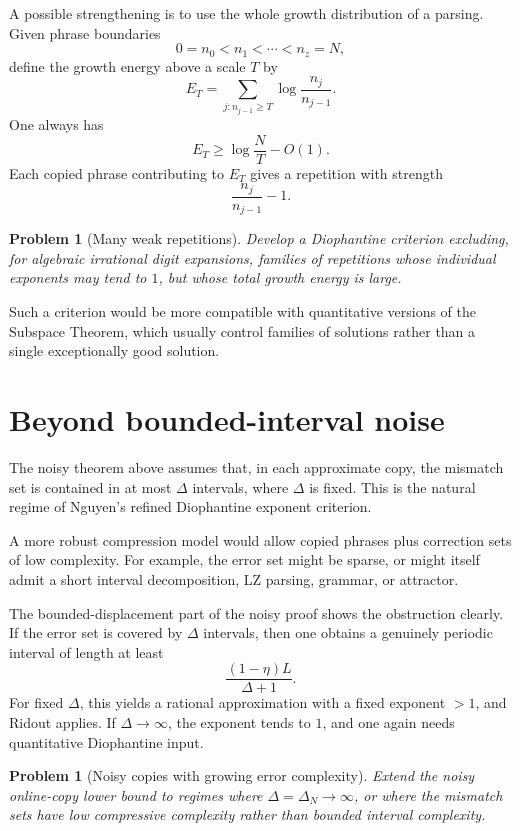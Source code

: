 \documentclass[11pt]{amsart}
\newtheorem{problem}[theorem]{Problem}
\theoremstyle{definition}
\begin{document}
A possible strengthening is to use the whole growth distribution of a parsing. Given phrase boundaries
\[
0=n_0<n_1<\cdots<n_z=N,
\]
define the growth energy above a scale \(T\) by
\[
E_T
=
\sum_{j:n_{j-1}\geq T}
\log\frac{n_j}{n_{j-1}}.
\]
One always has
\[
E_T\geq \log\frac{N}{T}-O(1).
\]
Each copied phrase contributing to \(E_T\) gives a repetition with strength
\[
\frac{n_j}{n_{j-1}}-1.
\]

\begin{problem}[Many weak repetitions]
Develop a Diophantine criterion excluding, for algebraic irrational digit expansions, families of repetitions whose individual exponents may tend to \(1\), but whose total growth energy is large.
\end{problem}

Such a criterion would be more compatible with quantitative versions of the Subspace Theorem, which usually control families of solutions rather than a single exceptionally good solution.

\section{Beyond bounded-interval noise}

The noisy theorem above assumes that, in each approximate copy, the mismatch set is contained in at most \(\Delta\) intervals, where \(\Delta\) is fixed. This is the natural regime of Nguyen's refined Diophantine exponent criterion.

A more robust compression model would allow copied phrases plus correction sets of low complexity. For example, the error set might be sparse, or might itself admit a short interval decomposition, LZ parsing, grammar, or attractor.

The bounded-displacement part of the noisy proof shows the obstruction clearly. If the error set is covered by \(\Delta\) intervals, then one obtains a genuinely periodic interval of length at least
\[
\frac{(1-\eta)L}{\Delta+1}.
\]
For fixed \(\Delta\), this yields a rational approximation with a fixed exponent \(>1\), and Ridout applies. If \(\Delta\to\infty\), the exponent tends to \(1\), and one again needs quantitative Diophantine input.

\begin{problem}[Noisy copies with growing error complexity]
Extend the noisy online-copy lower bound to regimes where \(\Delta=\Delta_N\to\infty\), or where the mismatch sets have low compressive complexity rather than bounded interval complexity.
\end{problem}
\end{document}
